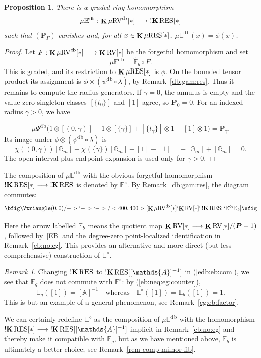 \documentclass[12pt]{amsart}
\theoremstyle{plain}
\newtheorem{prop}[thm]{Proposition}
\theoremstyle{definition}
\theoremstyle{remark}
\newtheorem{rem}[thm]{Remark}
\numberwithin{equation}{section}
\theoremstyle{plain}
\newcommand{\RV}{\textup{RV}}
\newcommand{\A}{\mathds{A}}
\newcommand{\G}{\mathds{G}}
\newcommand{\0}{\emptyset}
\newcommand{\bb}[1]{\mathbb{#1}}
\newcommand{\fun}{\longrightarrow}
\newcommand{\mgRV}{{\mu}{\RV}}
\newcommand{\RES}{\textup{RES}}
\newcommand{\mgRES}{{\mu}{\RES}}
\newcommand{\mgE}{{\mu}{\bb E}}
\DeclareMathOperator{\ggk}{\mathbf{K}}
\DeclareMathOperator{\sggk}{!\mathbf{K}}
\DeclareMathOperator{\db}{d \! b}
\begin{document}
\begin{prop}\label{prop:eu:retr:k:db}
There is a graded ring homomorphism
\[
  \mgE^{\db}: \ggk \mgRV^{\db}[*] \fun \sggk \RES[*]
\]
such that $(\bm P_\Gamma)$ vanishes and, for all $x \in \ggk \mgRES[*]$, $\mgE^{\db}(x) = \phi(x)$.
\end{prop}
\begin{proof}
Let $F:\ggk\mgRV^{\db}[*]\fun\ggk\RV[*]$ be the forgetful homomorphism and set
\[
\mgE^{\db}=\widetilde{\bb E}_b\circ F.
\]
This is graded, and its restriction to $\ggk\mgRES[*]$ is $\phi$. On the bounded tensor product its assignment is $\phi\times(\psi^{\db}\circ\lambda)$, by Remark~\ref{db:gam:res}. Thus it remains to compute the radius generators.
If $\gamma=0$, the annulus is empty and the value-zero singleton classes $[\{t_0\}]$ and $[1]$ agree, so $\bm P_0=0$. For an indexed radius $\gamma>0$, we have

\[
{\mu}\Psi^{\db}\bigl(1\otimes[(0,\gamma)]+1\otimes[\{\gamma\}]
+[\{t_\gamma\}]\otimes1-[1]\otimes1\bigr)=\bm P_\gamma.
\]
Its image under $\phi\otimes(\psi^{\db}\circ\lambda)$ is
\[
\chi((0,\gamma))[\G_m]+\chi(\{\gamma\})[\G_m]+[1]-[1]
=-[\G_m]+[\G_m]=0.
\]
The open-interval-plus-endpoint expansion is used only for $\gamma>0$.
\end{proof}

The composition of $\mgE^{\db}$ with the obvious forgetful homomorphism $\sggk \RES[*] \fun \sggk \RES$ is denoted by $\bb E^{\diamond}$.  By Remark~\ref{db:gam:res}, the diagram commutes:
\begin{equation}\label{edb:eb:com}
\bfig
 \Vtriangle(0,0)/->`->`->/<400, 400>[{\ggk \mgRV^{\db}[*]}`{\ggk \RV[*]}`\sggk \RES; `\bb E^{\diamond}`\bb E_b]
\efig
\end{equation}

Here the arrow labelled $\bb E_b$ means the quotient map $\ggk\RV[*]\fun\ggk\RV[*]/(\bm P-1)$, followed by~\eqref{EB} and the degree-zero point-localized identification in Remark~\ref{eb:no:eg}.
This provides an alternative and more direct (but less comprehensive) construction of $\bb E^{\diamond}$.

\begin{rem}\label{eb:not:eg}
Changing $\sggk \RES$ to $\sggk \RES[[\A]^{-1}]$ in (\ref{edb:eb:com}), we see that  $\bb E_g$ does not commute with $\bb E^{\diamond}$: by (\ref{eb:neq:eg:counter}),
\[
\bb E_g([1]) = [\A]^{-1} \quad \text{whereas} \quad \bb E^{\diamond}([1]) = \bb E_b([1]) = 1.
\]
This is but an example of a general phenomenon, see Remark~\ref{eg:eb:factor}.


We can certainly redefine $\bb E^{\diamond}$ as the composition of $\mgE^{\db}$ with  the homomorphism $\sggk \RES[*] \fun \sggk \RES[[\A]^{-1}]$ implicit in Remark~\ref{eb:no:eg} and thereby make it compatible with $\bb E_g$, but as we have mentioned above, $\bb E_b$ is ultimately a better choice; see Remark~\ref{rem-comp-milnor-fib}.
\end{rem}
\end{document}
